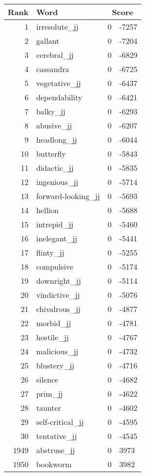 \begin{longtable}[!htbp]{| rlr@{.}l |}
    \hline
    \textbf{Rank} & \textbf{Word} & \multicolumn{2}{c|}{\textbf{Score}} \\
    \hline
    \endhead
    1 & irresolute\_jj & 0 & -7257 \\
    2 & gallant & 0 & -7204 \\
    3 & cerebral\_jj & 0 & -6829 \\
    4 & cassandra & 0 & -6725 \\
    5 & vegetative\_jj & 0 & -6437 \\
    6 & dependability & 0 & -6421 \\
    7 & balky\_jj & 0 & -6293 \\
    8 & abusive\_jj & 0 & -6207 \\
    9 & headlong\_jj & 0 & -6044 \\
    10 & butterfly & 0 & -5843 \\
    11 & didactic\_jj & 0 & -5835 \\
    12 & ingenious\_jj & 0 & -5714 \\
    13 & forward-looking\_jj & 0 & -5693 \\
    14 & hellion & 0 & -5688 \\
    15 & intrepid\_jj & 0 & -5460 \\
    16 & inelegant\_jj & 0 & -5441 \\
    17 & flinty\_jj & 0 & -5255 \\
    18 & compulsive & 0 & -5174 \\
    19 & downright\_jj & 0 & -5114 \\
    20 & vindictive\_jj & 0 & -5076 \\
    21 & chivalrous\_jj & 0 & -4877 \\
    22 & morbid\_jj & 0 & -4781 \\
    23 & hostile\_jj & 0 & -4767 \\
    24 & malicious\_jj & 0 & -4732 \\
    25 & blustery\_jj & 0 & -4716 \\
    26 & silence & 0 & -4682 \\
    27 & prim\_jj & 0 & -4622 \\
    28 & taunter & 0 & -4602 \\
    29 & self-critical\_jj & 0 & -4595 \\
    30 & tentative\_jj & 0 & -4545 \\
    1949 & abstruse\_jj & 0 & 3973 \\
    1950 & bookworm & 0 & 3982 \\

\end{longtable}
